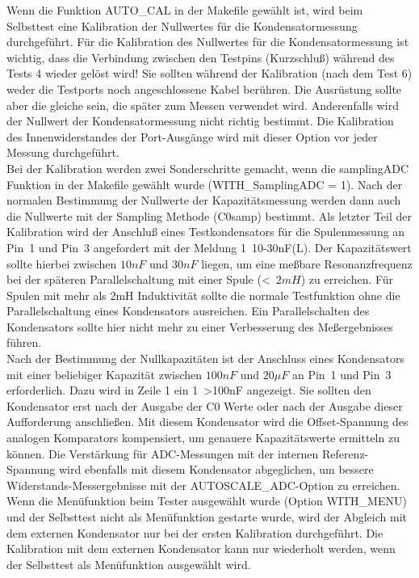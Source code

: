 Wenn die Funktion AUTO\_CAL in der Makefile gewählt ist, wird beim Selbsttest
eine Kalibration der Nullwertes für die Kondensatormessung durchgeführt.
Für die Kalibration des Nullwertes für die Kondensatormessung ist wichtig, 
dass die Verbindung zwischen den Testpins (Kurzschluß) während des Tests 4 wieder gelöst wird!
Sie sollten während der Kalibration (nach dem Test 6) weder die Testports noch angeschlossene Kabel berühren.
Die Ausrüstung sollte aber die gleiche sein, die später zum Messen verwendet wird.
Anderenfalls wird der Nullwert der Kondensatormessung nicht richtig bestimmt.
Die Kalibration des Innenwiderstandes der Port-Ausgänge wird mit dieser Option vor jeder
Messung durchgeführt. \\

Bei der Kalibration werden zwei Sonderschritte gemacht, wenn die samplingADC Funktion in der Makefile gewählt wurde (WITH\_SamplingADC = 1).
Nach der normalen Bestimmung der Nullwerte der Kapazitätsmessung werden dann auch die Nullwerte mit
der Sampling Methode (C0samp) bestimmt. Als letzter Teil der Kalibration wird der Anschluß eines Testkondensators für die
Spulenmessung an Pin~1 und Pin~3 angefordert mit der Meldung \mbox{1   10-30nF(L)}.
Der Kapazitätswert sollte hierbei zwischen \(10nF\) und \(30nF\) liegen,
um eine meßbare Resonanzfrequenz bei der späteren Parallelschaltung mit einer Spule (\textless~\(2mH\)) zu erreichen.
Für Spulen mit mehr als 2mH Induktivität sollte die normale Testfunktion ohne die Parallelschaltung eines
Kondensators ausreichen. Ein Parallelschalten des Kondensators sollte hier nicht mehr 
zu einer Verbesserung des Meßergebnisses führen.\\

Nach der Bestimmung der Nullkapazitäten ist der Anschluss eines Kondensators 
mit einer beliebiger Kapazität zwischen \(100nF\) und \(20\mu F\) an Pin~1 und Pin~3 erforderlich.
Dazu wird in Zeile 1 ein \mbox{1 \textgreater 100nF} angezeigt.
Sie sollten den Kondensator erst nach der Ausgabe der C0 Werte oder nach der Ausgabe dieser Aufforderung anschließen.
Mit diesem Kondensator wird die Offset-Spannung des analogen Komparators kompensiert,
um genauere Kapazitätswerte ermitteln zu können.
Die Verstärkung für ADC-Messungen mit der internen Referenz-Spannung wird ebenfalls mit diesem Kondensator abgeglichen, um
bessere Widerstands-Messergebnisse mit der AUTOSCALE\_ADC-Option zu erreichen.
Wenn die Menüfunktion beim Tester ausgewählt wurde (Option WITH\_MENU) und der Selbsttest
nicht als Menüfunktion gestarte wurde, wird der Abgleich mit dem externen Kondensator nur bei
der ersten Kalibration durchgeführt.
Die Kalibration mit dem externen Kondensator kann nur wiederholt werden, wenn der Selbsttest
als Menüfunktion ausgewählt wird.

